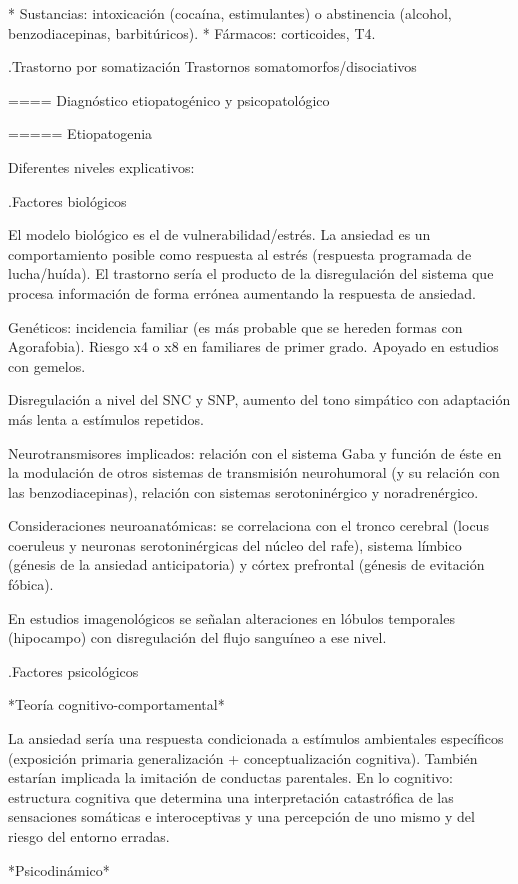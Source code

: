 \documentclass{scrbook}
\begin{document}
* Sustancias: intoxicación (cocaína, estimulantes) o abstinencia (alcohol, benzodiacepinas, barbitúricos).
* Fármacos: corticoides, T4.

.Trastorno por somatización
Trastornos somatomorfos/disociativos

==== Diagnóstico etiopatogénico y psicopatológico

===== Etiopatogenia

Diferentes niveles explicativos:

.Factores biológicos

El modelo biológico es el de vulnerabilidad/estrés. La ansiedad es un comportamiento posible como respuesta al estrés (respuesta programada de lucha/huída). El trastorno sería el producto de la disregulación del sistema que procesa información de forma errónea aumentando la respuesta de ansiedad.

Genéticos: incidencia familiar (es más probable que se hereden formas con Agorafobia). Riesgo x4 o x8 en familiares de primer grado. Apoyado en estudios con gemelos.

Disregulación a nivel del SNC y SNP, aumento del tono simpático con adaptación más lenta a estímulos repetidos.

Neurotransmisores implicados: relación con el sistema Gaba y función de éste en la modulación de otros sistemas de transmisión neurohumoral (y su relación con las benzodiacepinas), relación con sistemas serotoninérgico y noradrenérgico.

Consideraciones neuroanatómicas: se correlaciona con el tronco cerebral (locus coeruleus y neuronas serotoninérgicas del núcleo del rafe), sistema límbico (génesis de la ansiedad anticipatoria) y córtex prefrontal (génesis de evitación fóbica).

En estudios imagenológicos se señalan alteraciones en lóbulos temporales (hipocampo) con disregulación del flujo sanguíneo a ese nivel.

.Factores psicológicos

*Teoría cognitivo-comportamental*

La ansiedad sería una respuesta condicionada a estímulos ambientales específicos (exposición primaria generalización + conceptualización cognitiva). También estarían implicada la imitación de conductas parentales.
En lo cognitivo: estructura cognitiva que determina una interpretación catastrófica de las sensaciones somáticas e interoceptivas y una percepción de uno mismo y del riesgo del entorno erradas.

*Psicodinámico*
\end{document}
